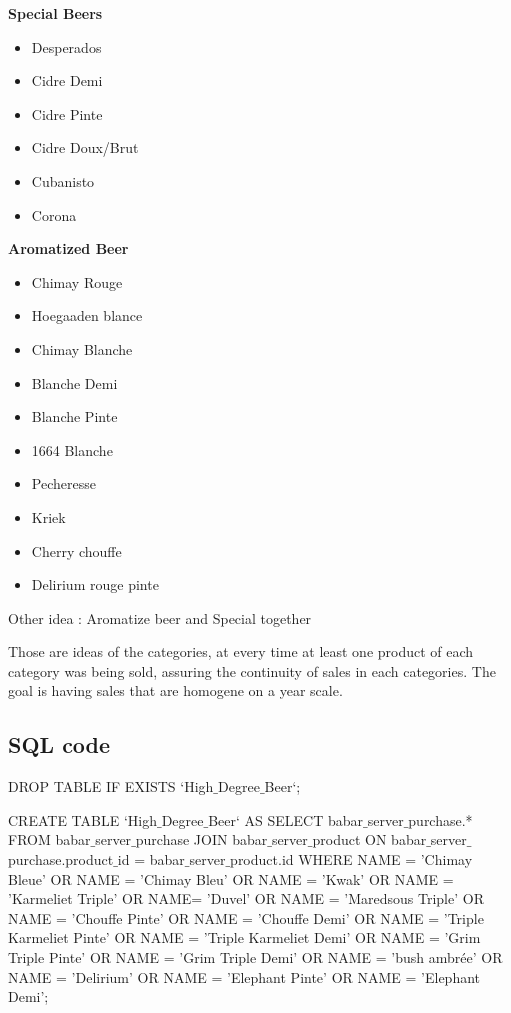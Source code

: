 \documentclass{report}
\begin{document}
\textbf{Special Beers}
\begin{itemize}
\item Desperados
\item Cidre Demi
\item Cidre Pinte
\item Cidre Doux/Brut
\item Cubanisto
\item Corona
\end{itemize}

\textbf{Aromatized Beer}
\begin{itemize}
\item Chimay Rouge
\item Hoegaaden blance
\item Chimay Blanche
\item Blanche Demi
\item Blanche Pinte
\item 1664 Blanche
\item Pecheresse
\item Kriek
\item Cherry chouffe
\item Delirium rouge pinte
\end{itemize}

Other idea : Aromatize beer and Special together

Those are ideas of the categories, at every time at least one product of each category was being sold, assuring the continuity of sales in each categories. The goal is having sales that are homogene on a year scale.


\subsection{SQL code}

DROP TABLE IF EXISTS `High$\_$Degree$\_$Beer`;

CREATE TABLE `High$\_$Degree$\_$Beer` 
	AS SELECT babar$\_$server$\_$purchase.* FROM babar$\_$server$\_$purchase JOIN babar$\_$server$\_$product ON babar$\_$server$\_$purchase.product$\_$id = babar$\_$server$\_$product.id WHERE
	NAME = 'Chimay Bleue' OR NAME = 'Chimay Bleu' OR NAME = 'Kwak' OR NAME = 'Karmeliet Triple' OR NAME= 'Duvel' OR NAME = 'Maredsous Triple'
	OR NAME = 'Chouffe Pinte' OR NAME = 'Chouffe Demi'  OR NAME = 'Triple Karmeliet Pinte' OR NAME = 'Triple Karmeliet Demi'  OR NAME = 'Grim Triple Pinte'
	OR NAME = 'Grim Triple Demi' OR NAME = 'bush ambrée' OR NAME = 'Delirium' OR NAME = 'Elephant Pinte' OR NAME = 'Elephant Demi';
\end{document}
